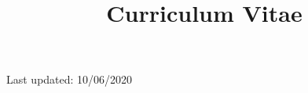 \documentclass[a4paper,12pt]{curve}
\title{Curriculum Vitae}
\begin{document}
            \makeheaders[t]
            \maketitle
            \begin{center}
Last updated: 10/06/2020
\end{center}
            
\end{document}
